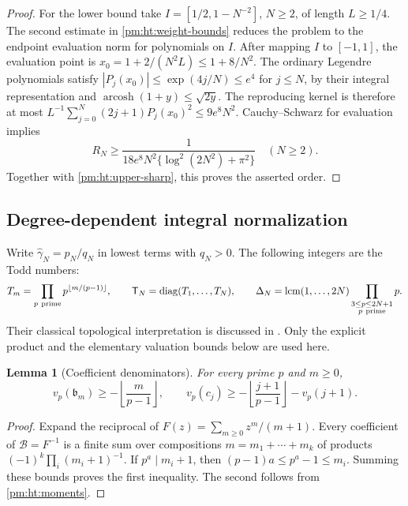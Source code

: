 \documentclass[11pt,a4paper]{article}
\newtheorem{lemma}[theorem]{Lemma}
\theoremstyle{definition}
\theoremstyle{remark}
\numberwithin{equation}{section}
\begin{document}
\begin{proof}
For the lower bound take $I=[1/2,1-N^{-2}]$, $N\geq2$, of length
$L\geq1/4$.  The second estimate in \eqref{pm:ht:weight-bounds} reduces
the problem to the endpoint evaluation norm for polynomials on $I$.
After mapping $I$ to $[-1,1]$, the evaluation point is
$x_0=1+2/(N^2L)\leq1+8/N^2$.  The ordinary Legendre polynomials
satisfy $|P_j(x_0)|\leq\exp(4j/N)\leq e^4$ for $j\leq N$,
by their integral representation and
$\operatorname{arcosh}(1+y)\leq\sqrt{2y}$.
The reproducing kernel is therefore at most
$L^{-1}\sum_{j=0}^N(2j+1)P_j(x_0)^2\leq9e^8N^2$.
Cauchy--Schwarz for evaluation implies
\begin{equation}\label{pm:ht:lower-sharp}
 R_N\geq\frac1{18e^8N^2\{\log^2(2N^2)+\pi^2\}}\quad(N\geq2).
\end{equation}
Together with \eqref{pm:ht:upper-sharp}, this proves the asserted order.
\end{proof}

\subsection{Degree-dependent integral normalization}

Write $\widehat\gamma_N=p_N/q_N$ in lowest terms with $q_N>0$.
The following integers are the Todd numbers:
\begin{equation}\label{pm:ht:todd}
 T_m=\prod_{p\ {\rm prime}}p^{\lfloor m/(p-1)\rfloor},\qquad
 \mathsf T_N=\operatorname{diag}(T_1,\ldots,T_N),\qquad
 \Delta_N=\operatorname{lcm}(1,\ldots,2N)
       \prod_{\substack{3\leq p\leq2N+1\\p\ {\rm prime}}}p.
\end{equation}
Their classical topological interpretation is discussed in
\cite{pm:BuchstaberVeselov2024}.  Only the explicit product and the
elementary valuation bounds below are used here.

\begin{lemma}[Coefficient denominators]\label{pm:ht:coefficient}
For every prime $p$ and $m\geq0$,
\[
 v_p(\mathfrak b_m)\geq-\left\lfloor\frac{m}{p-1}\right\rfloor,
 \qquad
 v_p(c_j)\geq-\left\lfloor\frac{j+1}{p-1}\right\rfloor-v_p(j+1).
\]
\end{lemma}
\begin{proof}
Expand the reciprocal of $F(z)=\sum_{m\geq0}z^m/(m+1)$.
Every coefficient of $\mathscr B=F^{-1}$ is a finite sum over compositions
$m=m_1+\cdots+m_k$ of products $(-1)^k\prod_i(m_i+1)^{-1}$.
If $p^a\mid m_i+1$, then
$(p-1)a\leq p^a-1\leq m_i$.  Summing these bounds proves the
first inequality.  The second follows from \eqref{pm:ht:moments}.
\end{proof}
\end{document}
